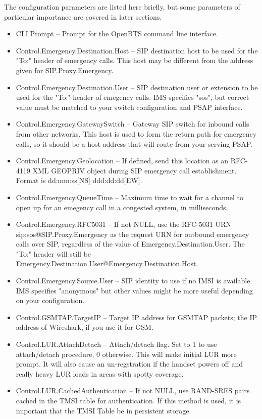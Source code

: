 \documentclass[11pt,openany]{book}
\begin{document}
The configuration parameters are listed here briefly, but some parameters of particular importance are covered in later sections.


\begin{itemize}
\item CLI.Prompt -- Prompt for the OpenBTS command line interface.
\item Control.Emergency.Destination.Host -- SIP destination host to be used for the "To:" header of emergency calls.  This host may be different from the address given for SIP.Proxy.Emergency.
\item Control.Emergency.Destination.User -- SIP destination user or extension to be used for the "To:" header of emegency calls.  IMS specifies "sos", but correct value must be matched to your switch configuration and PSAP interface.
\item Control.Emergency.GatewaySwitch -- Gateway SIP switch for inbound calls from other networks.  This host is used to form the return path for emergency calls, so it should be a host address that will route from your serving PSAP.
\item Control.Emergency.Geolocation -- If defined, send this location as an RFC-4119 XML GEOPRIV object during SIP emergency call establishment.  Format is dd:mm:ss[NS] ddd:dd:dd[EW].
\item Control.Emergency.QueueTime -- Maximum time to wait for a channel to open up for an emegency call in a congested system, in milliseconds.
\item Control.Emergency.RFC5031 -- If not NULL, use the RFC-5031 URN sip:sos@SIP.Proxy.Emergency as the request URN for outbound emergency calls over SIP, regardless of the value of Emergency.Destination.User.  The "To:" header will still be Emergency.Destination.User@Emergency.Destination.Host.
\item Control.Emergency.Source.User -- SIP identity to use if no IMSI is available.  IMS specifies "anonymous" but other values might be more useful depending on your configuration.
\item Control.GSMTAP.TargetIP -- Target IP address for GSMTAP packets; the IP address of Wireshark, if you use it for GSM.
\item Control.LUR.AttachDetach -- Attach/detach flag.  Set to 1 to use attach/detach procedure, 0 otherwise.  This will make initial LUR more prompt.  It will also cause an un-regstration if the handset powers off and really heavy LUR loads in areas with spotty coverage.
\item Control.LUR.CachedAuthentication -- If not NULL, use RAND-SRES pairs cached in the TMSI table for authentication.  If this method is used, it is important that the TMSI Table be in persistent storage.

\end{itemize}
\end{document}
